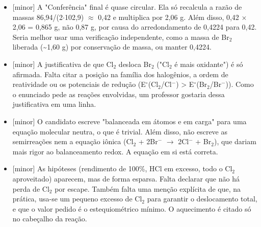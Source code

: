 \documentclass{article}%
\begin{document}
\begin{itemize}%
\item%
{[}minor{]} A "Conferência" final é quase circular. Ela só recalcula a razão de massas 86,94/(2$\cdot$102,9) $\approx$ 0,42 e multiplica por 2,06 g. Além disso, 0,42 $\times$ 2,06 = 0,865 g, não 0,87 g, por causa do arredondamento de 0,4224 para 0,42. Seria melhor usar uma verificação independente, como a massa de Br$_{2}$ liberada (\textasciitilde{}1,60 g) por conservação de massa, ou manter 0,4224.%
\item%
{[}minor{]} A justificativa de que Cl$_{2}$ desloca Br$_{2}$ ("Cl$_{2}$ é mais oxidante") é só afirmada. Falta citar a posição na família dos halogênios, a ordem de reatividade ou os potenciais de redução (E$^\circ$(Cl$_{2}$/Cl$^{-}$) > E$^\circ$(Br$_{2}$/Br$^{-}$)). Como o enunciado pede as reações envolvidas, um professor gostaria dessa justificativa em uma linha.%
\item%
{[}minor{]} O candidato escreve "balanceada em átomos e em carga" para uma equação molecular neutra, o que é trivial. Além disso, não escreve as semirreações nem a equação iônica (Cl$_{2}$ + 2Br$^{-}$ $\to$ 2Cl$^{-}$ + Br$_{2}$), que dariam mais rigor ao balanceamento redox. A equação em si está correta.%
\item%
{[}minor{]} As hipóteses (rendimento de 100\%, HCl em excesso, todo o Cl$_{2}$ aproveitado) aparecem, mas de forma esparsa. Falta declarar que não há perda de Cl$_{2}$ por escape. Também falta uma menção explícita de que, na prática, usa{-}se um pequeno excesso de Cl$_{2}$ para garantir o deslocamento total, e que o valor pedido é o estequiométrico mínimo. O aquecimento é citado só no cabeçalho da reação.%
\end{itemize}%
\end{document}
